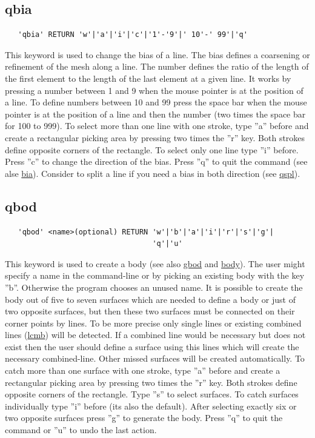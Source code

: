 \documentclass{article}
\providecommand{\htmlref}[2]{\hyperref[#2]{#1}}
\begin{document}
\subsection{\label{qbia}qbia}
\begin{verbatim}
   'qbia' RETURN 'w'|'a'|'i'|'c'|'1'-'9'|' 10'-' 99'|'q' 
\end{verbatim}
This keyword is used to change the bias of a line. The bias defines a coarsening or refinement of the mesh along a line. The number defines the ratio of the length of the first element to the length of the last element at a given line. It works by pressing a number between 1 and 9 when the mouse pointer is at the position of a line. To define numbers between 10 and 99 press the space bar when the mouse pointer is at the position of a line and then the number (two times the space bar for 100 to 999). To select more than one line with one stroke, type ''a'' before and create a rectangular picking area by pressing two times the ''r'' key. Both strokes define opposite corners of the rectangle. To select only one line type ''i'' before. Press ''c'' to change the direction of the bias. Press ''q'' to quit the command (see alse \htmlref{bia}{bia}). Consider to split a line if you need a bias in both direction (see \htmlref{qspl}{qspl}).

\subsection{\label{qbod}qbod}
\begin{verbatim}
   'qbod' <name>(optional) RETURN 'w'|'b'|'a'|'i'|'r'|'s'|'g'|
                                  'q'|'u'
\end{verbatim}
This keyword is used to create a body (see also \htmlref{gbod}{gbod} and \htmlref{body}{body}). The user might specify a name in the command-line or by picking an existing body with the key ''b''. Otherwise the program chooses an unused name. It is possible to create the body out of five to seven surfaces which are needed to define a body or just of two opposite surfaces, but then these two surfaces must be connected on their corner points by lines. To be more precise only single lines or existing combined lines (\htmlref{lcmb}{lcmb}) will be detected. If a combined line would be necessary but does not exist then the user should define a surface using this lines which will create the necessary combined-line. Other missed surfaces will be created automatically. To catch more than one surface with one stroke, type ''a'' before and create a rectangular picking area by pressing two times the ''r'' key. Both strokes define opposite corners of the rectangle. Type ''s'' to select surfaces. To catch surfaces individually type ''i'' before (its also the default). After selecting exactly six or two opposite surfaces press ''g'' to generate the body. Press ''q'' to quit the command or ''u'' to undo the last action.
\end{document}
